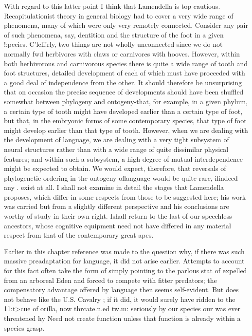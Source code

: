 With regard to this latter point I think that Lamendella is top cautious. Recapitulationist theory in general biology had to cover a very wide range of phenomena, many of which were only very re\-motely connected. Consider any pair of such phenomena, say, dentition and the structure of the foot in a given !:pecies. C'leli!rly, two things are not wholly unconnected since we do not normally fwd herbivores with claws or carnivores with hooves. However, within both herbivorous and carnivorous species there is quite a wide range of tooth and foot structures, detailed development of each of which must have proceeded with a good deal of independence from the other. It should therefore be unsurprising that on occasion the precise sequence of developments should have been shuffled somewhat between phylogeny and ontogeny{}-that, for example, in a given phylum, a certain type of tooth might have developed earlier than a certain type of foot, but that, in the embryonic forms of some contemporary species, that type
of foot might develop earlier than that type of tooth. However, when we are dealing with the development of language, we are dealing with a very tight subsystem of neural structures rather than with a wide range of quite dissimilar physical features; and within such a sub\-system, a high degree of mutual interdependence might be expected to obtain. We would expect, therefore, that reversals of phylogenetic
ordering in the ontogeny oflanguage would be quite rare, ifindeed any . exist at all.
I shall not examine in detail the stages that Lamendella proposes, which differ in some respects from those to be suggested here; his work was carried but from a slightly different perspective and his conclusions are worthy of study in their own right. Ishall return to the last of our speechless ancestors, whose cognitive equipment need not have differed in any material respect from that of the contemporary great apes.

Earlier in this chapter reference was made to the question why, if there was such massive preadaptation for language, it did not arise earlier. Attempts to account for this fact often take the form of simply pointing to the parlous stat of  expelled from an arboreal Eden and forced to compete with fitter predators; the compensatory advantage offered by language then seems self-evident. But  does not behave like the U.S. Cavalry ; if it did, it would surely have ridden to the 11:t{\textgreater}cue of orilla, now thrcate.n.ed tw.m: seriously by our species our was ever threatened hy Need
not create function unless that function is already within a species grasp.

